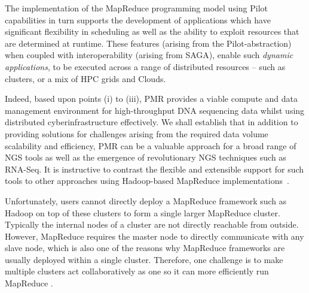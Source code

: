 \documentclass{acm_proc_article-sp}
\begin{document}



The implementation of the MapReduce programming model using Pilot
capabilities in turn supports the development of applications which
have significant flexibility in scheduling as well as the ability to
exploit resources that are determined at runtime.  These features
(arising from the Pilot-abstraction) when coupled with
interoperability (arising from SAGA), enable such {\it dynamic
  applications}, to be executed across a range of distributed
resources -- such as clusters, or a mix of HPC grids and Clouds.

Indeed, based upon points (i) to (iii), PMR provides a viable compute
and data management environment for high-throughput DNA sequencing
data whilst using distributed cyberinfrastructure
effectively.  %
We shall establish that in addition to providing solutions for challenges arising from the
required data volume scalability and efficiency, PMR can be a valuable approach 
for a broad range of NGS tools as well as the emergence of
revolutionary NGS techniques such as RNA-Seq.  It is instructive to
contrast the flexible and extensible support for such tools to other
approaches using Hadoop-based MapReduce
implementations~\cite{cloudburst,langmead2009,seal2011,langmead2010}.






Unfortunately, users cannot directly deploy a MapReduce framework such
as Hadoop on top of these clusters to form a single larger MapReduce
cluster. Typically the internal nodes of a cluster are not directly
reachable from outside. However, MapReduce requires the master node to
directly communicate with any slave node, which is also one of the
reasons why MapReduce frameworks are usually deployed within a single
cluster. Therefore, one challenge is to make multiple clusters act
collaboratively as one so it can more efficiently run MapReduce \cite{ecmls11-mr-autodock}.
 
\end{document}
